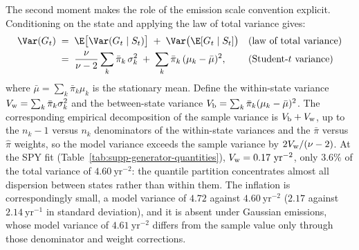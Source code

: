 The second moment makes the role of the emission scale convention
explicit. Conditioning on the state and applying the law of total
variance gives:
\begin{align}
  \Var(G_t)
   &\;=\; \E\big[\Var(G_t \mid S_t)\big]
     \;+\; \Var\big(\E[G_t \mid S_t]\big)
     && \text{(law of total variance)} \notag \\
   &\;=\; \frac{\nu}{\nu - 2} \sum_k \bar\pi_k\, \sigma_k^2
     \;+\; \sum_k \bar\pi_k\, (\mu_k - \bar\mu)^2,
     && \text{(Student-$t$ variance)}
  \label{eq:supp-variance}
\end{align}
where $\bar\mu = \sum_k \bar\pi_k \mu_k$ is the stationary mean.
Define the within-state variance $V_{\rm w} = \sum_k \bar\pi_k
\sigma_k^2$ and the between-state variance $V_{\rm b} = \sum_k
\bar\pi_k (\mu_k - \bar\mu)^2$. The corresponding empirical
decomposition of the sample variance is $V_{\rm b} + V_{\rm w}$, up to
the $n_k - 1$ versus $n_k$ denominators of the within-state variances
and the $\bar\pi$ versus $\hat\pi$ weights, so the model variance
exceeds the sample variance by $2 V_{\rm w} / (\nu - 2)$. At the SPY fit
(Table~\ref{tab:supp-generator-quantities}),
$V_{\rm w} = 0.17~\mathrm{yr}^{-2}$, only $3.6\%$ of the total
variance of $4.60~\mathrm{yr}^{-2}$: the quantile partition
concentrates almost all dispersion between states rather than within
them. The inflation is correspondingly small, a model variance of
$4.72$ against $4.60~\mathrm{yr}^{-2}$ ($2.17$ against
$2.14~\mathrm{yr}^{-1}$ in standard deviation), and it is absent under
Gaussian emissions, whose model variance of $4.61~\mathrm{yr}^{-2}$
differs from the sample value only through those denominator and
weight corrections.

